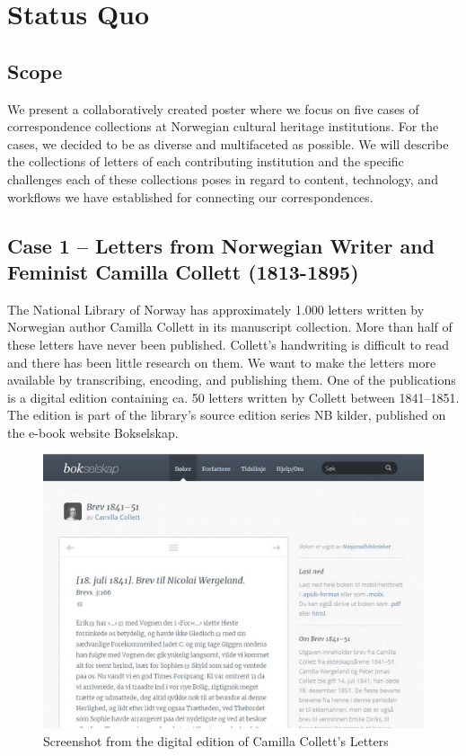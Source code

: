 \documentclass[runningheads]{llncs}
\begin{document}
\section{Status Quo}\label{status-quo}
\subsection{Scope}\label{scope}
We present a collaboratively created poster where we focus
on five cases of correspondence collections at Norwegian cultural
heritage institutions. For the cases, we decided to be as diverse and
multifaceted as possible. We will describe the collections of letters of
each contributing institution and the specific challenges each of these
collections poses in regard to content, technology, and workflows we
have established for connecting our correspondences.

\subsection{Case 1 -- Letters from Norwegian Writer and Feminist
Camilla Collett
(1813-1895)}
The National Library of Norway has approximately 1.000 letters written
by  Norwegian author Camilla Collett in its manuscript
collection. More than half of these letters have never been published.
Collett's handwriting is difficult to read and there has been little
research on them. We want to make the letters more
available by transcribing, encoding, and publishing them. One of the
publications is a digital edition containing ca. 50 letters
written by Collett between 1841–1851. The edition is part of the
library's source edition series NB kilder, published on the e-book
website Bokselskap.~\cite{url_boks}

\begin{figure}[h!]
\centering
\includegraphics[width=\textwidth]{CC_BS.jpg}
\caption{Screenshot from the digital edition of Camilla Collett's Letters} \label{fig1}
\end{figure}
\end{document}
